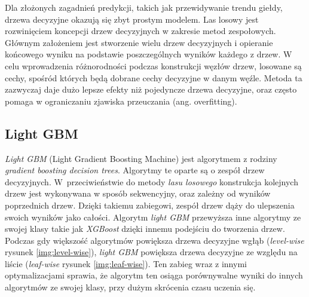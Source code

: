 \documentclass[a4paper, twoside, 11pt, openright]{article}
\begin{document}
Dla złożonych zagadnień predykcji, takich jak przewidywanie trendu giełdy, drzewa decyzyjne okazują się zbyt prostym modelem. Las losowy jest rozwinięciem koncepcji drzew decyzyjnych w zakresie metod zespołowych. Głównym założeniem jest stworzenie wielu drzew decyzyjnych i opieranie końcowego wyniku na podstawie poszczególnych wyników każdego z drzew. W celu wprowadzenia różnorodności podczas konstrukcji węzłów drzew, losowane są cechy, spośród których będą dobrane cechy decyzyjne w danym węźle. Metoda ta zazwyczaj daje dużo lepsze efekty niż pojedyncze drzewa decyzyjne, oraz często pomaga w ograniczaniu zjawiska przeuczania (ang. overfitting).  

\subsection{Light GBM}

\textit{Light GBM} (Light Gradient Boosting Machine) \cite{lgbm} jest algorytmem z rodziny \textit{gradient boosting decision trees}. Algorytmy te oparte są o zespół drzew decyzyjnych. W~przeciwieństwie do metody \textit{lasu losowego} konstrukcja kolejnych drzew jest wykonywana w sposób sekwencyjny, oraz zależny od wyników poprzednich drzew. Dzięki takiemu zabiegowi, zespół drzew dąży do ulepszenia swoich wyników jako całości. Algorytm \textit{light GBM} przewyższa inne algorytmy ze swojej klasy takie jak \textit{XGBoost} dzięki innemu podejściu do tworzenia drzew. Podczas gdy większość algorytmów powiększa drzewa decyzyjne wgłąb (\textit{level-wise}  rysunek \ref{img:level-wise}), \textit{light GBM} powiększa drzewa decyzyjne ze względu na liście (\textit{leaf-wise} rysunek \ref{img:leaf-wise}). Ten zabieg wraz z innymi optymalizacjami sprawia, że algorytm ten osiąga porównywalne wyniki do innych algorytmów ze swojej klasy, przy dużym skrócenia czasu uczenia się. 
\end{document}
